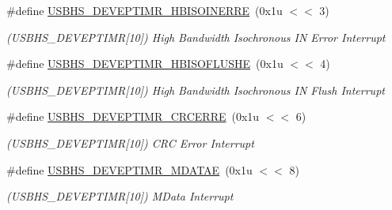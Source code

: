 \begin{DoxyCompactItemize}
\mbox{\label{group__SAMS70__USBHS_ga54e551347b283a2baeaf23522e7eacab}} 
\#define \mbox{\hyperlink{group__SAMS70__USBHS_ga54e551347b283a2baeaf23522e7eacab}{U\+S\+B\+H\+S\+\_\+\+D\+E\+V\+E\+P\+T\+I\+M\+R\+\_\+\+H\+B\+I\+S\+O\+I\+N\+E\+R\+RE}}~(0x1u $<$$<$ 3)
\begin{DoxyCompactList}\small\item\em (U\+S\+B\+H\+S\+\_\+\+D\+E\+V\+E\+P\+T\+I\+MR\mbox{[}10\mbox{]}) High Bandwidth Isochronous IN Error Interrupt \end{DoxyCompactList}\item 
\mbox{\label{group__SAMS70__USBHS_gaaed6d79e76bd673a011e23626c594991}} 
\#define \mbox{\hyperlink{group__SAMS70__USBHS_gaaed6d79e76bd673a011e23626c594991}{U\+S\+B\+H\+S\+\_\+\+D\+E\+V\+E\+P\+T\+I\+M\+R\+\_\+\+H\+B\+I\+S\+O\+F\+L\+U\+S\+HE}}~(0x1u $<$$<$ 4)
\begin{DoxyCompactList}\small\item\em (U\+S\+B\+H\+S\+\_\+\+D\+E\+V\+E\+P\+T\+I\+MR\mbox{[}10\mbox{]}) High Bandwidth Isochronous IN Flush Interrupt \end{DoxyCompactList}\item 
\mbox{\label{group__SAMS70__USBHS_gaf11b63faa3c81681651d1c618d4a8896}} 
\#define \mbox{\hyperlink{group__SAMS70__USBHS_gaf11b63faa3c81681651d1c618d4a8896}{U\+S\+B\+H\+S\+\_\+\+D\+E\+V\+E\+P\+T\+I\+M\+R\+\_\+\+C\+R\+C\+E\+R\+RE}}~(0x1u $<$$<$ 6)
\begin{DoxyCompactList}\small\item\em (U\+S\+B\+H\+S\+\_\+\+D\+E\+V\+E\+P\+T\+I\+MR\mbox{[}10\mbox{]}) C\+RC Error Interrupt \end{DoxyCompactList}\item 
\mbox{\label{group__SAMS70__USBHS_ga8dbb85f27a0c6b5f6ddf2d3f7aee3c10}} 
\#define \mbox{\hyperlink{group__SAMS70__USBHS_ga8dbb85f27a0c6b5f6ddf2d3f7aee3c10}{U\+S\+B\+H\+S\+\_\+\+D\+E\+V\+E\+P\+T\+I\+M\+R\+\_\+\+M\+D\+A\+T\+AE}}~(0x1u $<$$<$ 8)
\begin{DoxyCompactList}\small\item\em (U\+S\+B\+H\+S\+\_\+\+D\+E\+V\+E\+P\+T\+I\+MR\mbox{[}10\mbox{]}) M\+Data Interrupt \end{DoxyCompactList}\item 
\mbox{\label{group__SAMS70__USBHS_gaf3e4e1efe7661d24c3cb60e370824a04}} 

\end{DoxyCompactItemize}
